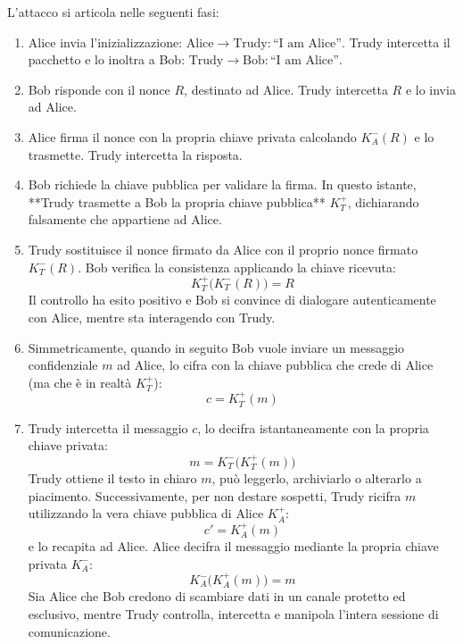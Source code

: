 \documentclass[11pt, a4paper]{article}
\begin{document}

L'attacco si articola nelle seguenti fasi:
\begin{enumerate}[leftmargin=*]
    \item Alice invia l'inizializzazione: $\text{Alice} \to \text{Trudy}: \text{``I am Alice''}$. Trudy intercetta il pacchetto e lo inoltra a Bob: $\text{Trudy} \to \text{Bob}: \text{``I am Alice''}$.
    \item Bob risponde con il nonce $R$, destinato ad Alice. Trudy intercetta $R$ e lo invia ad Alice.
    \item Alice firma il nonce con la propria chiave privata calcolando $K_A^-(R)$ e lo trasmette. Trudy intercetta la risposta.
    \item Bob richiede la chiave pubblica per validare la firma. In questo istante, **Trudy trasmette a Bob la propria chiave pubblica** $K_T^+$, dichiarando falsamente che appartiene ad Alice.
    \item Trudy sostituisce il nonce firmato da Alice con il proprio nonce firmato $K_T^-(R)$. Bob verifica la consistenza applicando la chiave ricevuta:
    \[
    K_T^+\bigl(K_T^-(R)\bigr) = R
    \]
    Il controllo ha esito positivo e Bob si convince di dialogare autenticamente con Alice, mentre sta interagendo con Trudy.
    \item Simmetricamente, quando in seguito Bob vuole inviare un messaggio confidenziale $m$ ad Alice, lo cifra con la chiave pubblica che crede di Alice (ma che è in realtà $K_T^+$):
    \[
    c = K_T^+(m)
    \]
    \item Trudy intercetta il messaggio $c$, lo decifra istantaneamente con la propria chiave privata:
    \[
    m = K_T^-\bigl(K_T^+(m)\bigr)
    \]
    Trudy ottiene il testo in chiaro $m$, può leggerlo, archiviarlo o alterarlo a piacimento. Successivamente, per non destare sospetti, Trudy ricifra $m$ utilizzando la vera chiave pubblica di Alice $K_A^+$:
    \[
    c' = K_A^+(m)
    \]
    e lo recapita ad Alice. Alice decifra il messaggio mediante la propria chiave privata $K_A^-$:
    \[
    K_A^-\bigl(K_A^+(m)\bigr) = m
    \]
    Sia Alice che Bob credono di scambiare dati in un canale protetto ed esclusivo, mentre Trudy controlla, intercetta e manipola l'intera sessione di comunicazione.
\end{enumerate}
\end{document}
